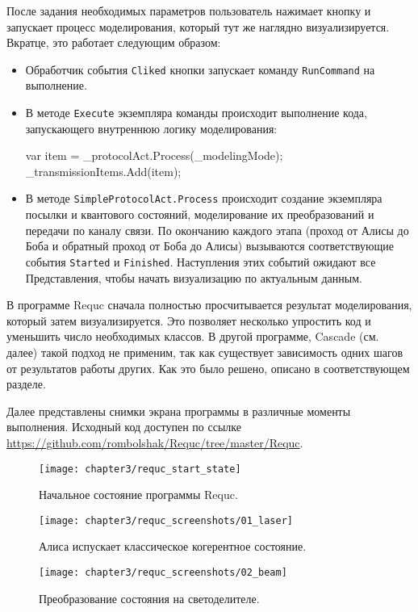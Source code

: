 После задания необходимых параметров пользователь нажимает кнопку и запускает процесс моделирования, который тут же наглядно визуализируется. 
Вкратце, это работает следующим образом:
\begin{itemize}
  \item Обработчик события \texttt{Cliked} кнопки запускает команду \texttt{RunCommand} на выполнение.
  \item В методе \texttt{Execute} экземпляра команды происходит выполнение кода, запускающего внутреннюю логику моделирования:
    \begin{csharpcode}
      var item = _protocolAct.Process(_modelingMode);
      _transmissionItems.Add(item);
    \end{csharpcode}
  \item В методе \texttt{SimpleProtocolAct.Process} происходит создание экземпляра посылки и квантового состояний, моделирование их преобразований и передачи по каналу связи. По окончанию каждого этапа (проход от Алисы до Боба и обратный проход от Боба до Алисы) вызываются соответствующие события \texttt{Started} и \texttt{Finished}. Наступления этих событий ожидают все Представления, чтобы начать визуализацию по актуальным данным.
\end{itemize}

В программе Requc сначала полностью просчитывается результат моделирования, который затем визуализируется. Это позволяет несколько упростить код и уменьшить число необходимых классов. В другой программе, Cascade (см. далее) такой подход не применим, так как существует зависимость одних шагов от результатов работы других. Как это было решено, описано в соответствующем разделе.

Далее представлены снимки экрана программы в различные моменты выполнения. Исходный код доступен по ссылке \url{https://github.com/rombolshak/Requc/tree/master/Requc}.
\begin{figure}[h]
  \texttt{[image: chapter3/requc\_start\_state]}
  \caption{Начальное состояние программы Requc.}
  \label{fig:requc_start_state}
\end{figure}

\begin{figure}[h]
  \texttt{[image: chapter3/requc\_screenshots/01\_laser]}
  \caption{Алиса испускает классическое когерентное состояние.}
\end{figure}

\begin{figure}[h]
  \texttt{[image: chapter3/requc\_screenshots/02\_beam]}
  \caption{Преобразование состояния на светоделителе.}
\end{figure}

